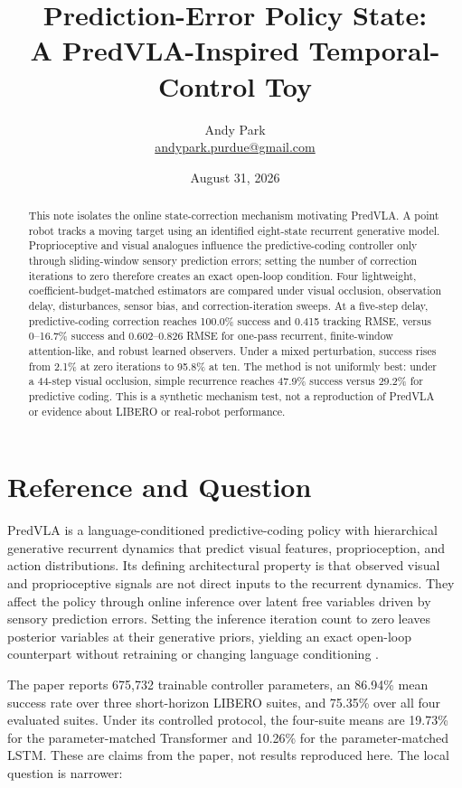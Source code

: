 \documentclass[11pt]{article}
\title{Prediction-Error Policy State:\\A PredVLA-Inspired Temporal-Control Toy}
\author{Andy Park\\\href{mailto:andypark.purdue@gmail.com}{andypark.purdue@gmail.com}}
\date{August 31, 2026}
\begin{document}
\setlength{\emergencystretch}{3em}
\maketitle

\begin{abstract}
This note isolates the online state-correction mechanism motivating PredVLA. A point robot tracks a moving target using an identified eight-state recurrent generative model. Proprioceptive and visual analogues influence the predictive-coding controller only through sliding-window sensory prediction errors; setting the number of correction iterations to zero therefore creates an exact open-loop condition. Four lightweight, coefficient-budget-matched estimators are compared under visual occlusion, observation delay, disturbances, sensor bias, and correction-iteration sweeps. At a five-step delay, predictive-coding correction reaches 100.0\% success and 0.415 tracking RMSE, versus 0--16.7\% success and 0.602--0.826 RMSE for one-pass recurrent, finite-window attention-like, and robust learned observers. Under a mixed perturbation, success rises from 2.1\% at zero iterations to 95.8\% at ten. The method is not uniformly best: under a 44-step visual occlusion, simple recurrence reaches 47.9\% success versus 29.2\% for predictive coding. This is a synthetic mechanism test, not a reproduction of PredVLA or evidence about LIBERO or real-robot performance.
\end{abstract}

\section{Reference and Question}

PredVLA is a language-conditioned predictive-coding policy with hierarchical generative recurrent dynamics that predict visual features, proprioception, and action distributions. Its defining architectural property is that observed visual and proprioceptive signals are not direct inputs to the recurrent dynamics. They affect the policy through online inference over latent free variables driven by sensory prediction errors. Setting the inference iteration count to zero leaves posterior variables at their generative priors, yielding an exact open-loop counterpart without retraining or changing language conditioning \cite{predvla}.

The paper reports 675,732 trainable controller parameters, an 86.94\% mean success rate over three short-horizon LIBERO suites, and 75.35\% over all four evaluated suites. Under its controlled protocol, the four-suite means are 19.73\% for the parameter-matched Transformer and 10.26\% for the parameter-matched LSTM. These are claims from the paper, not results reproduced here. The local question is narrower:
\end{document}
